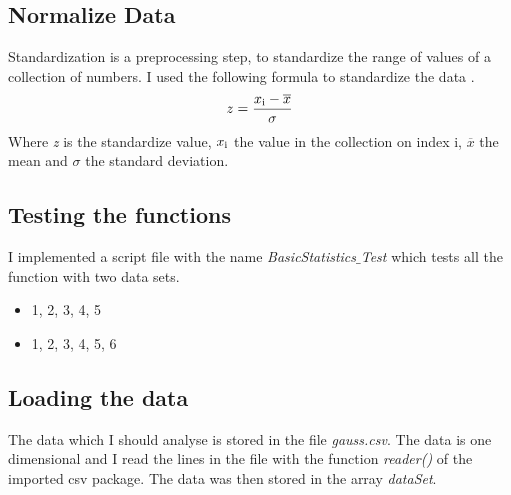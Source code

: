 \documentclass[10pt, a4paper, twocolumn]{article} %
\begin{document}



\subsection{Normalize Data}
Standardization is a preprocessing step, to standardize the range of values of a collection of numbers. I used the following formula to standardize the data
\citep{standardizeDataBuildIn}. 
\[
z = \frac{x\textsubscript{i} - \overline{x}}{\sigma}
\]
Where \textit{z} is the standardize value, \textit{$x\textsubscript{i}$} the value in the collection on index i, \textit{$\overline{x}$} the mean and \textit{$\sigma$} the standard deviation.


\subsection{Testing the functions}
I implemented a script file with the name \textit{BasicStatistics$\_$Test} which tests all the function with two data sets. 

\begin{itemize}
	\item 1, 2, 3, 4, 5
	\item 1, 2, 3, 4, 5, 6
\end{itemize}
                                                                                                                                                                                                                                                              
\subsection{Loading the data}
The data which I should analyse is stored in the file \textit{gauss.csv}. The data is one dimensional and I read the lines in the file with the function \textit{reader()} of the imported csv package. The data was then stored in the array \textit{dataSet}. 


\end{document}
